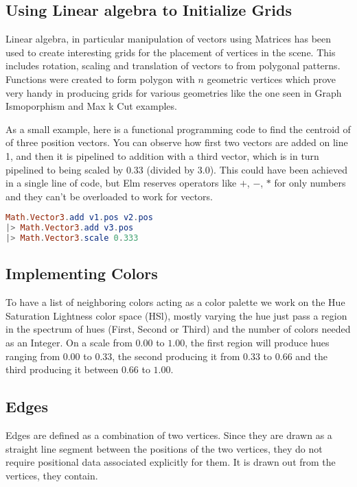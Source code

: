 \subsection{Using Linear algebra to Initialize Grids}
Linear algebra, in particular manipulation of vectors using Matrices has been
used to create interesting grids for the placement of vertices in the scene.
This includes rotation, scaling and translation of vectors to from polygonal
patterns. Functions were created to form polygon with $n$ geometric vertices
which prove very handy in producing grids for various geometries like
the one seen in Graph Ismoporphism and Max k Cut examples.

As a small example, here is a functional programming code to find the centroid
of of three position vectors. You can observe how first two vectors are added
on line 1, and then it is pipelined to addition with a third vector, which is
in turn pipelined to being scaled by $0.33$ (divided by $3.0$). This could have
been achieved in a single line of code, but Elm reserves operators like $+$,
$-$, $*$ for only numbers and they can't be overloaded to work for vectors.

\begin{lstlisting}[language=elm]
Math.Vector3.add v1.pos v2.pos
|> Math.Vector3.add v3.pos
|> Math.Vector3.scale 0.333
\end{lstlisting}

\subsection{Implementing Colors}
To have a list of neighboring colors acting as a color palette we work on the
Hue Saturation Lightness color space (HSl), mostly varying the hue just pass a
region in the spectrum of hues (First, Second or Third) and the number of
colors needed as an Integer. On a scale from $0.00$ to $1.00$, the first region
will produce hues ranging from $0.00$ to $0.33$, the second producing it from
$0.33$ to $0.66$ and the third producing it between $0.66$ to $1.00$.

\subsection{Edges}
Edges are defined as a combination of two vertices. Since they are drawn as a
straight line segment between the positions of the two vertices, they do not require
positional data associated explicitly for them. It is drawn out from the vertices,
they contain.


